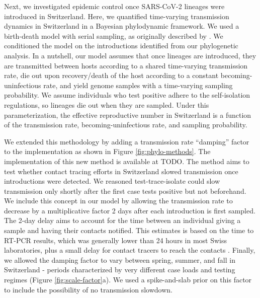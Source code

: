 \documentclass[11pt,twoside,lineno]{pnas-new} %
\begin{document}
Next, we investigated epidemic control once SARS-CoV-2 lineages were introduced in Switzerland. Here, we quantified time-varying transmission dynamics in Switzerland in a Bayesian phylodynamic framework. We used a birth-death model with serial sampling, as originally described by \cite{stadler_2010_bds}. We conditioned the model on the introductions identified from our phylogenetic analysis. In a nutshell, our model assumes that once lineages are introduced, they are transmitted between hosts according to a shared time-varying transmission rate, die out upon recovery/death of the host according to a constant becoming-uninfectious rate, and yield genome samples with a time-varying sampling probability. We assume individuals who test positive adhere to the self-isolation regulations, so lineages die out when they are sampled. Under this parameterization, the effective reproductive number in Switzerland is a function of the transmission rate, becoming-uninfectious rate, and sampling probability.

We extended this methodology by adding a transmission rate ``damping'' factor to the implementation as shown in Figure \ref{fig:phylo-methods}. The implementation of this new method is available at TODO. The method aims to test whether contact tracing efforts in Switzerland slowed transmission once introductions were detected. We reasoned test-trace-isolate could slow transmission only shortly after the first case tests positive but not beforehand. We include this concept in our model by allowing the transmission rate to decrease by a multiplicative factor 2 days after each introduction is first sampled. The 2-day delay aims to account for the time between an individual giving a sample and having their contacts notified. This estimates is based on the time to RT-PCR results, which was generally lower than 24 hours in most Swiss laboratories, plus a small delay for contact tracers to reach the contacts \cite{Marquis2021}. Finally, we allowed the damping factor to vary between spring, summer, and fall in Switzerland - periods characterized by very different case loads and testing regimes (Figure \ref{fig:scale-factor}a). We used a spike-and-slab prior on this factor to include the possibility of no transmission slowdown. 
\end{document}
